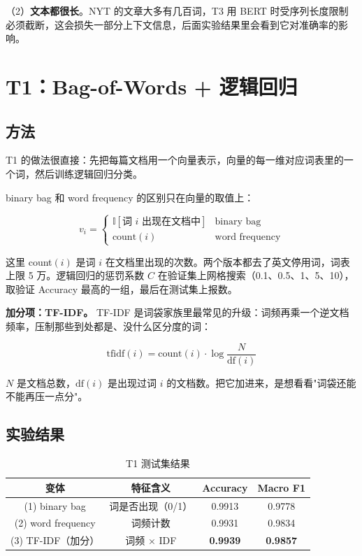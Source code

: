 \documentclass[UTF8,a4paper,10pt]{ctexart}
\begin{document}
（2）\textbf{文本都很长}。NYT 的文章大多有几百词，T3 用 BERT 时受序列长度限制必须截断，这会损失一部分上下文信息，后面实验结果里会看到它对准确率的影响。

\section{T1：Bag-of-Words + 逻辑回归}

\subsection{方法}

T1 的做法很直接：先把每篇文档用一个向量表示，向量的每一维对应词表里的一个词，然后训练逻辑回归分类。

binary bag 和 word frequency 的区别只在向量的取值上：

$$v_i = \begin{cases}
\mathbb{I}[\text{词 } i \text{ 出现在文档中}] & \text{binary bag}\\
\text{count}(i) & \text{word frequency}
\end{cases}$$

这里 count$(i)$ 是词 $i$ 在文档里出现的次数。两个版本都去了英文停用词，词表上限 5 万。逻辑回归的惩罚系数 $C$ 在验证集上网格搜索（0.1、0.5、1、5、10），取验证 Accuracy 最高的一组，最后在测试集上报数。

\textbf{加分项：TF-IDF。} TF-IDF 是词袋家族里最常见的升级：词频再乘一个逆文档频率，压制那些到处都是、没什么区分度的词：

$$\text{tfidf}(i) = \text{count}(i) \cdot \log\frac{N}{\text{df}(i)}$$

$N$ 是文档总数，$\text{df}(i)$ 是出现过词 $i$ 的文档数。把它加进来，是想看看"词袋还能不能再压一点分"。

\subsection{实验结果}

\begin{table}[htbp]
\centering
\caption{T1 测试集结果}
\label{tab:t1}
\begin{tabular}{cccc}
\toprule
\textbf{变体} & \textbf{特征含义} & \textbf{Accuracy} & \textbf{Macro F1} \\
\midrule
(1) binary bag & 词是否出现（0/1） & 0.9913 & 0.9778 \\
(2) word frequency & 词频计数 & 0.9931 & 0.9834 \\
(3) TF-IDF（加分） & 词频 $\times$ IDF & \textbf{0.9939} & \textbf{0.9857} \\
\bottomrule
\end{tabular}
\end{table}
\end{document}
